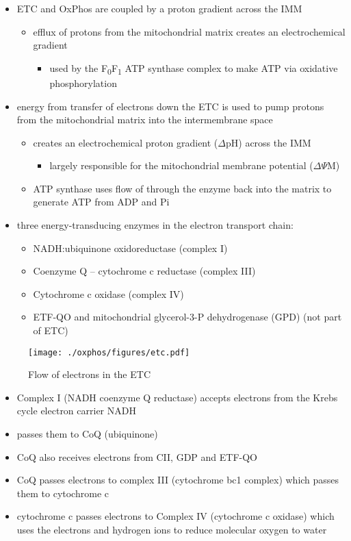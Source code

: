 \documentclass[12pt]{scrartcl}
\begin{document}
\begin{itemize}
\item ETC and OxPhos are coupled by a proton gradient across the IMM
\begin{itemize}
\item efflux of protons from the mitochondrial matrix creates an
electrochemical gradient
\begin{itemize}
\item used by the F\textsubscript{0}F\textsubscript{1} ATP synthase complex to make ATP via oxidative phosphorylation
\end{itemize}
\end{itemize}
\item energy from transfer of electrons down the ETC is used to pump
protons from the mitochondrial matrix into the intermembrane space
\begin{itemize}
\item creates an electrochemical proton gradient (\(\Delta\)pH) across the IMM
\begin{itemize}
\item largely responsible for the mitochondrial membrane potential (\(\Delta \Psi\)M)
\end{itemize}
\item ATP synthase uses flow of  through the enzyme back into the
matrix to generate ATP from ADP and Pi
\end{itemize}
\item three energy-transducing enzymes in the electron transport chain:
\begin{itemize}
\item NADH:ubiquinone oxidoreductase (complex I)
\item Coenzyme Q – cytochrome c reductase (complex III)
\item Cytochrome c oxidase (complex IV)
\item ETF-QO and mitochondrial glycerol-3-P dehydrogenase (GPD) (not part of ETC)
\end{itemize}
\end{itemize}

\begin{figure}[htbp]
\centering
\texttt{[image: ./oxphos/figures/etc.pdf]}
\caption{\label{fig:orgd307c0b}Flow of electrons in the ETC}
\end{figure}

\begin{itemize}
\item Complex I (NADH coenzyme Q reductase) accepts electrons from the
Krebs cycle electron carrier NADH
\item passes them to CoQ (ubiquinone)
\item CoQ also receives electrons from CII, GDP and ETF-QO

\item CoQ passes electrons to complex III (cytochrome bc1 complex) which
passes them to cytochrome c
\item cytochrome c passes electrons to Complex IV (cytochrome c oxidase)
which uses the electrons and hydrogen ions to reduce molecular
oxygen to water
\end{itemize}
\end{document}
